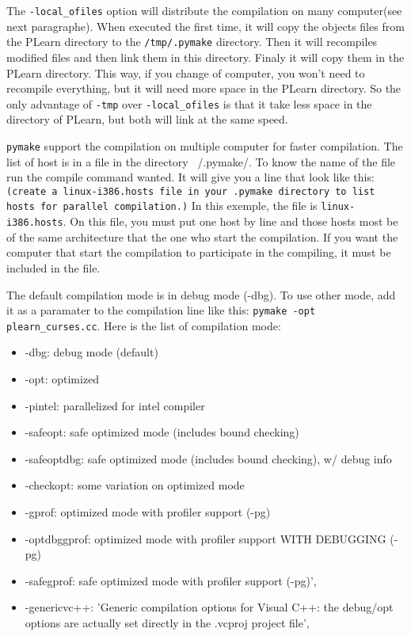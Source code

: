 \documentclass[11pt]{book}
\begin{document}
The \verb!-local_ofiles! option will distribute the compilation on many computer(see
next paragraphe). When executed the first time, it will copy the
objects files from the PLearn directory to the \verb!/tmp/.pymake!
directory. Then it will recompiles modified files and then link
them in this directory. Finaly it will
copy them in the PLearn directory. This way, if you change of
computer, you won't need to recompile everything, but it will need
more space in the PLearn directory.
So the only advantage of \verb!-tmp! over \verb!-local_ofiles! is that it take less
space in the directory of PLearn, but both will link at the same speed.

\verb!pymake! support the compilation on multiple computer for faster 
compilation. The list of host is in a file in the directory ~/.pymake/. To know the name of the file run the compile command wanted. It will give you a line that look like this: \verb!(create a linux-i386.hosts file in your .pymake directory to list hosts for parallel compilation.)! In this exemple, the file is \verb!linux-i386.hosts!.
On this file, you must put one host by line and those hosts most be of the same architecture that the one who start the compilation. If you want the computer that start the compilation to participate in the compiling, it must be included in the file.

The default compilation mode is in debug mode (-dbg). To use other mode, add it as a paramater to the compilation line like this: \verb!pymake -opt plearn_curses.cc!.
Here is the list of compilation mode:
\begin{itemize}
\item -dbg: debug mode (default)
\item -opt: optimized
\item -pintel: parallelized for intel compiler
\item -safeopt: safe optimized mode (includes bound checking)
\item -safeoptdbg: safe optimized mode (includes bound checking), w/ debug info
\item -checkopt: some variation on optimized mode
\item -gprof: optimized mode with profiler support (-pg)
\item -optdbggprof: optimized mode with profiler support WITH DEBUGGING (-pg)
\item -safegprof: safe optimized mode with profiler support (-pg)',
\item -genericvc++: 'Generic compilation options for Visual C++: the debug/opt options are actually set directly in the .vcproj project file',
\end{itemize}
\end{document}
